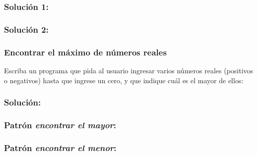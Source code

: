 \documentclass[12pt]{beamer}
\begin{document}
  \begin{frame}
    \frametitle{Solución 1:}
    
  \end{frame}

  \begin{frame}
    \frametitle{Solución 2:}
    
  \end{frame}

  \begin{frame}
    \frametitle{Encontrar el máximo de números reales}
    Escriba un programa que pida al usuario
    ingresar varios números reales (positivos o negativos)
    hasta que ingrese un cero,
    y que indique cuál es el mayor de ellos:
    
  \end{frame}

  \begin{frame}
    \frametitle{Solución:}
    
  \end{frame}

  \begin{frame}
    \frametitle{Patrón \emph{encontrar el mayor}:}
    
  \end{frame}

  \begin{frame}
    \frametitle{Patrón \emph{encontrar el menor}:}
    
  \end{frame}
\end{document}
